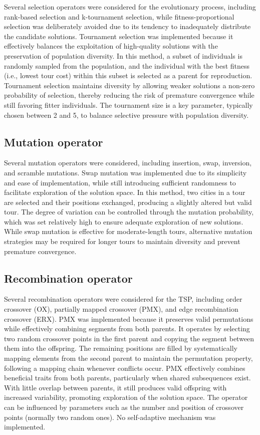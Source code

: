\documentclass[a4paper,10pt]{article}
\begin{document}
Several selection operators were considered for the evolutionary process, including rank-based selection and k-tournament selection, while fitness-proportional selection was deliberately avoided due to its tendency to inadequately distribute the candidate solutions. Tournament selection was implemented because it effectively balances the exploitation of high-quality solutions with the preservation of population diversity. In this method, a subset of individuals is randomly sampled from the population, and the individual with the best fitness (i.e., lowest tour cost) within this subset is selected as a parent for reproduction. Tournament selection maintains diversity by allowing weaker solutions a non-zero probability of selection, thereby reducing the risk of premature convergence while still favoring fitter individuals. The tournament size is a key parameter, typically chosen between 2 and 5, to balance selective pressure with population diversity.

\subsection{Mutation operator}

Several mutation operators were considered, including insertion, swap, inversion, and scramble mutations. Swap mutation was implemented due to its simplicity and ease of implementation, while still introducing sufficient randomness to facilitate exploration of the solution space. In this method, two cities in a tour are selected and their positions exchanged, producing a slightly altered but valid tour. The degree of variation can be controlled through the mutation probability, which was set relatively high to ensure adequate exploration of new solutions. While swap mutation is effective for moderate-length tours, alternative mutation strategies may be required for longer tours to maintain diversity and prevent premature convergence.

\subsection{Recombination operator}

Several recombination operators were considered for the TSP, including order crossover (OX), partially mapped crossover (PMX), and edge recombination crossover (ERX). PMX was implemented because it preserves valid permutations while effectively combining segments from both parents. It operates by selecting two random crossover points in the first parent and copying the segment between them into the offspring. The remaining positions are filled by systematically mapping elements from the second parent to maintain the permutation property, following a mapping chain whenever conflicts occur. PMX effectively combines beneficial traits from both parents, particularly when shared subsequences exist. With little overlap between parents, it still produces valid offspring with increased variability, promoting exploration of the solution space. The operator can be influenced by parameters such as the number and position of crossover points (normally two random ones). No self-adaptive mechanism was implemented.
\end{document}
